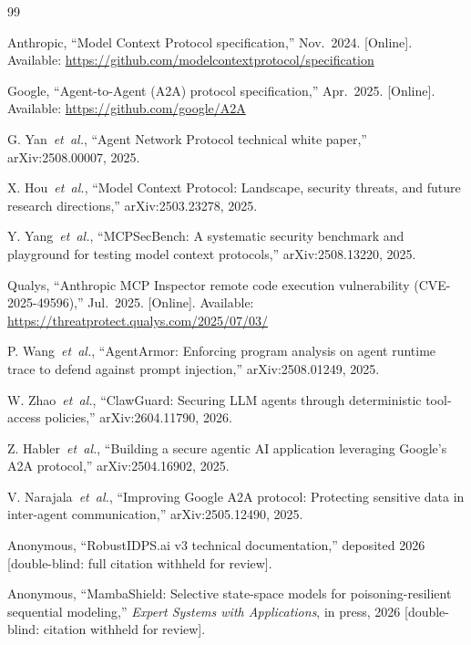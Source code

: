 \documentclass[journal,10pt,twocolumn]{IEEEtran}
\begin{document}
\begin{thebibliography}{99}

 Anthropic, ``Model Context Protocol specification,'' Nov.~2024. [Online]. Available: \url{https://github.com/modelcontextprotocol/specification}

 Google, ``Agent-to-Agent (A2A) protocol specification,'' Apr.~2025. [Online]. Available: \url{https://github.com/google/A2A}

 G. Yan~\textit{et~al.}, ``Agent Network Protocol technical white paper,'' arXiv:2508.00007, 2025.

 X. Hou~\textit{et~al.}, ``Model Context Protocol: Landscape, security threats, and future research directions,'' arXiv:2503.23278, 2025.

 Y. Yang~\textit{et~al.}, ``MCPSecBench: A systematic security benchmark and playground for testing model context protocols,'' arXiv:2508.13220, 2025.

 Qualys, ``Anthropic MCP Inspector remote code execution vulnerability (CVE-2025-49596),'' Jul.~2025. [Online]. Available: \url{https://threatprotect.qualys.com/2025/07/03/}

 P. Wang~\textit{et~al.}, ``AgentArmor: Enforcing program analysis on agent runtime trace to defend against prompt injection,'' arXiv:2508.01249, 2025.

 W. Zhao~\textit{et~al.}, ``ClawGuard: Securing LLM agents through deterministic tool-access policies,'' arXiv:2604.11790, 2026.

 Z. Habler~\textit{et~al.}, ``Building a secure agentic AI application leveraging Google's A2A protocol,'' arXiv:2504.16902, 2025.

 V. Narajala~\textit{et~al.}, ``Improving Google A2A protocol: Protecting sensitive data in inter-agent communication,'' arXiv:2505.12490, 2025.

 Anonymous, ``RobustIDPS.ai v3 technical documentation,'' deposited 2026 [double-blind: full citation withheld for review].

 Anonymous, ``MambaShield: Selective state-space models for poisoning-resilient sequential modeling,'' \textit{Expert Systems with Applications}, in press, 2026 [double-blind: citation withheld for review].


\end{thebibliography}
\end{document}
